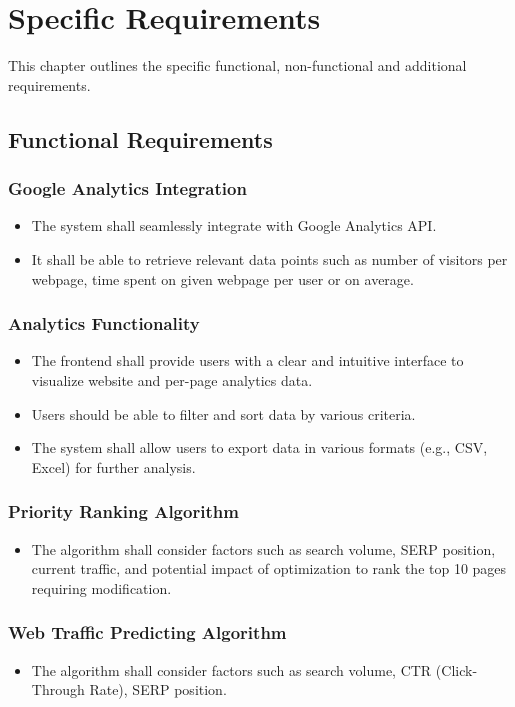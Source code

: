 \documentclass[12pt]{article}
\begin{document}
\section{Specific Requirements}
This chapter outlines the specific functional, non-functional and additional requirements.
\subsection{Functional Requirements}

\subsubsection{Google Analytics Integration}
\begin{itemize}
    \item The system shall seamlessly integrate with Google Analytics API.
    \item It shall be able to retrieve relevant data points such as number of visitors per webpage, time spent on given webpage per user or on average.
\end{itemize}

\subsubsection{Analytics Functionality}
\begin{itemize}
    \item The frontend shall provide users with a clear and intuitive interface to visualize website and per-page analytics data.
    \item Users should be able to filter and sort data by various criteria.
    \item The system shall allow users to export data in various formats (e.g., CSV, Excel) for further analysis.
\end{itemize}

\subsubsection{Priority Ranking Algorithm}
\begin{itemize}
    \item The algorithm shall consider factors such as search volume, SERP position, current traffic, and potential impact of optimization to rank the top 10 pages requiring modification.
\end{itemize}

\subsubsection{Web Traffic Predicting Algorithm}
\begin{itemize}
    \item The algorithm shall consider factors such as search volume, CTR (Click-Through Rate), SERP position.
\end{itemize}
\newpage 
\end{document}

